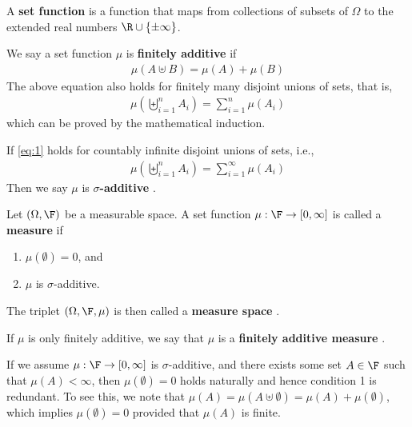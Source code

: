 \documentclass[thmcnt=section, 12pt]{elegantbook}
\begin{document}

\par A \textbf{set function}  is a function that maps from collections of subsets of $\Omega$ to the extended real numbers $\R \cup \left\{\pm \infty\right\}$.

\par We say a set function $\mu$ is \textbf{finitely additive}  if 
\begin{align*}
    \mu(A \uplus B) = \mu(A) + \mu(B)
\end{align*}
The above equation also holds for finitely many disjoint unions of sets, that is, 
\begin{align}
    \mu\left(\biguplus_{i=1}^n A_i\right) = \sum_{i=1}^n \mu(A_i)
    \label{eq:1}
\end{align}
which can be proved by the mathematical induction.

\par If \eqref{eq:1} holds for countably infinite disjoint unions of sets, i.e., 
\begin{align*}
    \mu\left(\biguplus_{i=1}^n A_i\right) = \sum_{i=1}^\infty \mu(A_i)
\end{align*}
Then we say $\mu$ is \textbf{$\sigma$-additive} . 


\begin{definition}
    Let $(\Omega, \F)$ be a measurable space. A set function $\mu: \F \to [0, \infty]$ is called a \textbf{measure}  if
    \begin{enumerate}
        \item $\mu(\emptyset) = 0$, and 
        \item $\mu$ is $\sigma$-additive.
    \end{enumerate}
    The triplet $(\Omega, \F, \mu)$ is then called a \textbf{measure space} .
\end{definition}

\par If $\mu$ is only finitely additive, we say that $\mu$ is a \textbf{finitely additive measure} . 

\begin{remark}
    If we assume $\mu: \F \to [0, \infty]$ is $\sigma$-additive, and there exists some set $A \in \F$ such that $\mu(A) < \infty$, then $\mu(\emptyset) = 0$ holds naturally and hence condition 1 is redundant. To see this, we note that $\mu(A) = \mu(A \uplus \emptyset) = \mu(A) + \mu(\emptyset)$, which implies $\mu(\emptyset) = 0$ provided that $\mu(A)$ is finite.
\end{remark}
\end{document}

